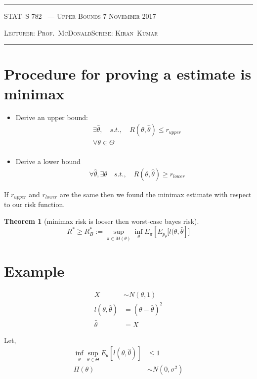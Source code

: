 \documentclass[10pt]{article}
\newcounter{lecnum}
\newtheorem{theorem}{Theorem}[lecnum]
\renewcommand{\hat}{\widehat}
\newcommand{\lecturer}{Prof.\ McDonald}
\newcommand{\scribe}{Kiran\ Kumar}
\newcommand{\chtitle}{Upper Bounds}
\newcommand{\lecdate}{7 November 2017}
\begin{document}
	\rule{6.5in}{1pt}
	
	\textsc{STAT--S 782
		\hfill \thelecnum\ --- \chtitle
		\hfill \lecdate}
	
	\textsc{Lecturer: \lecturer \hfill Scribe: \scribe}
	\rule{6.5in}{1pt}
	
	
	\section*{Procedure for proving a estimate is minimax}
	\begin{itemize}
		\item{Derive an upper bound: 
			\begin{align*}
				&\exists\hat{\theta},\quad s.t.,\quad R(\theta,\hat{\theta})\leq r_{upper}\\
				&\forall \theta \in \Theta\\
		\end{align*}}
		\item{Derive a lower bound
			\begin{align*}
				&\forall\hat{\theta},\exists \theta\quad s.t.,\quad R(\theta,\hat{\theta})\geq r_{lower}
			\end{align*}    
		}
	\end{itemize}
	
	If $r_{upper}$ and $r_{lower}$ are the same then we found the minimax estimate with respect to our risk function. 
	
	\begin{theorem}[minimax risk is looser then worst-case bayes risk]
		$$R^* \geq R^*_B := \sup\limits_{\pi \in M(\theta)}\inf\limits_{\theta} E_{\pi}\left[ E_{p_\theta}[l(\theta,\hat{\theta}\right]]$$
	\end{theorem}
	
	\section*{Example}
	
	\begin{align*}
		X &\sim N(\theta,1)\\
		l(\theta,\hat{\theta}) &= \left(\theta-\hat{\theta}\right)^2\\
		\hat{\theta} &= X
	\end{align*}
	
	Let, 
	\begin{align*}
		\inf\limits_{\hat{\theta}} \sup\limits_{\theta \in \Theta} E_{\theta}\left[ l(\theta,\hat{\theta})\right] &\leq 1\\
		\Pi(\theta) &\sim N(0, \sigma^2)
	\end{align*}
	
\end{document}
